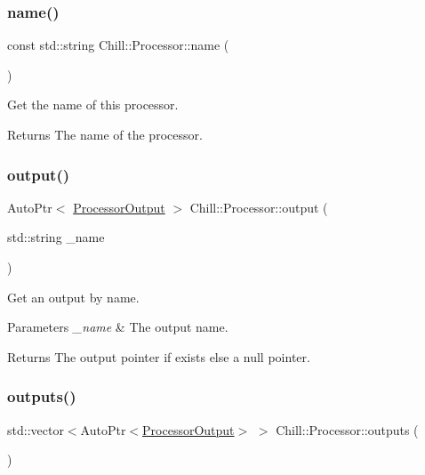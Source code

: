 \subsubsection{\texorpdfstring{name()}{name()}}
{\footnotesize\ttfamily const std\+::string Chill\+::\+Processor\+::name (\begin{DoxyParamCaption}{ }\end{DoxyParamCaption})\hspace{0.3cm}{\ttfamily [inline]}}

Get the name of this processor. \begin{DoxyReturn}{Returns}
The name of the processor. 
\end{DoxyReturn}
\mbox{\label{class_chill_1_1_processor_a26494f059d01af50bd66462e8c14fdb9}} 
\subsubsection{\texorpdfstring{output()}{output()}}
{\footnotesize\ttfamily Auto\+Ptr$<$ \mbox{\hyperlink{class_chill_1_1_processor_output}{Processor\+Output}} $>$ Chill\+::\+Processor\+::output (\begin{DoxyParamCaption}\item[{std\+::string}]{\+\_\+name }\end{DoxyParamCaption})}

Get an output by name. 
\begin{DoxyParams}{Parameters}
{\em \+\_\+name} & The output name. \\
\hline
\end{DoxyParams}
\begin{DoxyReturn}{Returns}
The output pointer if exists else a null pointer. 
\end{DoxyReturn}
\mbox{\label{class_chill_1_1_processor_a5ed85c9d070167d489eb51022863887a}} 
\subsubsection{\texorpdfstring{outputs()}{outputs()}}
{\footnotesize\ttfamily std\+::vector$<$Auto\+Ptr$<$\mbox{\hyperlink{class_chill_1_1_processor_output}{Processor\+Output}}$>$ $>$ Chill\+::\+Processor\+::outputs (\begin{DoxyParamCaption}{ }\end{DoxyParamCaption})\hspace{0.3cm}{\ttfamily [inline]}}

